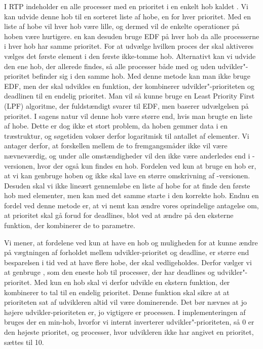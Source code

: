 I RTP  indeholder \sched en alle processer med en prioritet i en enkelt hob kaldet . Vi kan udvide denne hob til en sorteret liste af hobe, en for hver prioritet. Med en liste af hobe vil hver hob være lille, og dermed vil de enkelte operationer på hoben være hurtigere. \Sched en kan desuden bruge EDF på hver hob da alle processerne i hver hob har samme prioritet. For at udvælge hvilken proces der skal aktiveres vælges det første element i den første ikke-tomme hob. 
Alternativt kan vi udvide den ene hob, der allerede findes, så alle processer både med og uden udvikler"-prioritet befinder sig i den samme hob. Med denne metode kan man ikke bruge EDF, men der skal udvikles en funktion, der kombinerer  udvikler"-prioriteten og deadlinen til en endelig prioritet. Man vil så kunne bruge en Least Priority First (LPF) algoritme, der fuldstændigt svarer til EDF, men baserer udvælgelsen på prioritet. I sagens natur vil denne hob  være større end, hvis man brugte en liste af hobe. Dette er dog ikke et stort problem, da hoben gemmer data i en træstruktur, og søgetiden vokser derfor logaritmisk til antallet af elementer. Vi antager derfor, at forskellen mellem de to fremgangsmåder ikke vil være nævneværdig, og under alle omstændigheder vil den ikke være anderledes end i -versionen, hvor der også kun findes en hob. Fordelen ved kun at bruge en hob er, at vi kan genbruge  hoben og  ikke skal lave en større omskrivning af -versionen. Desuden skal vi ikke lineært gennemløbe en liste af hobe for at finde den første hob med elementer, men kan med det samme starte i den korrekte hob. Endnu en fordel ved denne metode er, at vi nemt kan  ændre vores oprindelige antagelse om, at prioritet skal gå forud for deadlines, blot ved at ændre på den eksterne funktion, der kombinerer de to parametre.

Vi mener, at fordelene ved kun at have en hob og muligheden for at kunne ændre på vægtningen af forholdet mellem udvikler-prioritet og deadline, er større end besparelsen i tid ved at have flere hobe, der skal vedligeholdes. Derfor vælger vi  at genbruge , som den eneste hob til  processer, der har deadlines og udvikler"-prioritet. Med kun en hob skal vi derfor udvikle en ekstern funktion, der kombinerer to tal til en endelig prioritet. Denne funktion skal sikre at at prioriteten sat af udvikleren altid vil være dominerende. Det bør nævnes at jo højere udvikler-prioriteten er, jo vigtigere er processen. I implementeringen af  bruges der en min-hob, hvorfor vi internt inverterer udvikler"-prioriteten, så 0 er den højeste prioritet, og processer, hvor udvikleren ikke har angivet en prioritet, sættes til 10.


